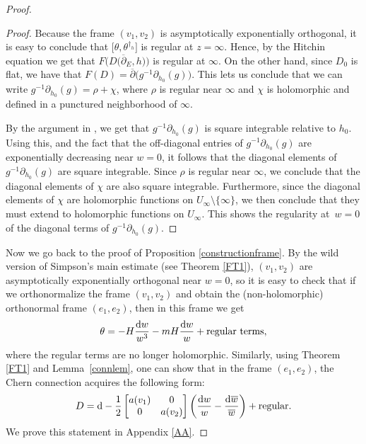 \begin{proof}
\begin{proof}
Because the frame $(v_1,v_2)$ is asymptotically exponentially orthogonal, it is easy to conclude that $\bigl[\theta,\theta^{\dagger_h}\bigr]$ is regular at $z=\infty$. Hence, by the Hitchin equation we get that $F\bigl(D\bigl(\overline{\partial}_E,h\bigr)\bigr)$ is regular at $\infty$. On the other hand, since $D_0$ is flat, we have that $F(D)=\overline{\partial}\bigl(g^{-1}\partial_{h_0}(g)\bigr)$. This lets us conclude that we can write $g^{-1}\partial_{h_0}(g)=\rho + \chi$, where $\rho$ is regular near $\infty$ and $\chi$ is holomorphic and defined in a punctured neighborhood of $\infty$.

By the argument in \cite[Proposition 10.3.3]{M}, we get that $g^{-1}\partial_{h_0}(g)$ is square integrable relative to $h_0$. Using this, and the fact that the off-diagonal entries of $g^{-1}\partial_{h_0}(g)$ are exponentially decreasing near $w=0$, it follows that the diagonal elements of $g^{-1}\partial_{h_0}(g)$ are square integrable. Since $\rho$ is regular near $\infty$, we conclude that the diagonal elements of $\chi$ are also square integrable. Furthermore, since the diagonal elements of $\chi$ are holomorphic functions on $U_{\infty}\setminus \{\infty\}$, we then conclude that they must extend to holomorphic functions on $U_{\infty}$. This shows the regularity at~${w=0}$ of the diagonal terms of $g^{-1}\partial_{h_0}(g)$.
\end{proof}

Now we go back to the proof of Proposition \ref{constructionframe}. By the wild version of Simpson's main estimate (see Theorem \ref{FT1}), $(v_1,v_2)$ are asymptotically exponentially orthogonal near $w=0$, so it is easy to check that if we orthonormalize the frame $(v_1,v_2)$ and obtain the (non-holomorphic) orthonormal frame $(e_1,e_2)$, then in this frame we get
\begin{equation}\label{higgscan}
 \theta=-H\frac{{\rm d}w}{w^3}-mH\frac{{\rm d}w}{w}+\text{regular terms},
\end{equation}
where the regular terms are no longer holomorphic. Similarly, using Theorem \ref{FT1} and Lem\-ma~\ref{connlem}, one can show that in the frame $(e_1,e_2)$, the Chern connection acquires the following form:
\begin{equation}\label{Dlemexp}
 D={\rm d} - \frac{1}{2}\begin{bmatrix} a(v_1) & 0 \\
 0 & a(v_2) \\
 \end{bmatrix}\left(\frac{{\rm d}w}{w}- \frac{{\rm d}\overline{w}}{\overline{w}}\right) + \text{regular}.
\end{equation}
We prove this statement in Appendix \ref{AA}.


\end{proof}
